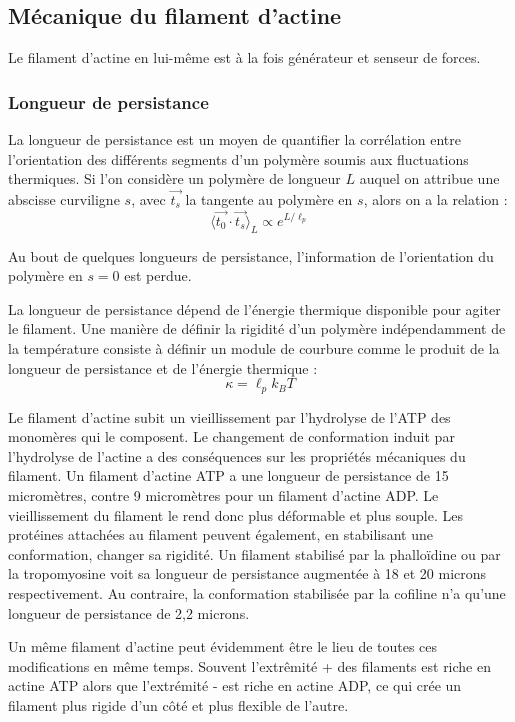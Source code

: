 \subsection{Mécanique du filament d'actine}

Le filament d'actine en lui-même est à la fois générateur et senseur de forces. 

 \subsubsection{Longueur de persistance}
La longueur de persistance est un moyen de quantifier la corrélation entre l'orientation des différents segments d'un polymère soumis aux fluctuations thermiques. Si l'on considère un polymère de longueur $L$ auquel on attribue une abscisse curviligne $s$, avec $\vec{t_s}$ la tangente au polymère en $s$, alors on a la relation : 
$$ \langle \vec{t_0}\cdot \vec{t_s} \rangle_L \propto e^{L/\ell_p}$$

Au bout de quelques longueurs de persistance, l'information de l'orientation du polymère en $s=0$ est perdue. 

La longueur de persistance dépend de l'énergie thermique disponible pour agiter le filament. Une manière de définir la rigidité d'un polymère indépendamment de la température consiste à définir un module de courbure comme le produit de la longueur de persistance et de l'énergie thermique : $$\kappa = \ell_p k_B T$$


Le filament d'actine subit un vieillissement par l'hydrolyse de l'ATP des monomères qui le composent. Le changement de conformation induit par l'hydrolyse de l'actine a des conséquences sur les propriétés mécaniques du filament. 
Un filament d'actine ATP a une longueur de persistance de 15 micromètres, contre 9 micromètres pour un filament d'actine ADP. Le vieillissement du filament le rend donc plus déformable et plus souple. 
Les protéines attachées au filament peuvent également, en stabilisant une conformation, changer sa rigidité. Un filament stabilisé par la phalloïdine ou par la tropomyosine voit sa longueur de persistance augmentée à 18 et 20 microns respectivement. Au contraire, la conformation stabilisée par la cofiline n'a qu'une longueur de persistance de 2,2 microns. 

Un même filament d'actine peut évidemment être le lieu de toutes ces modifications en même temps. Souvent l'extrêmité + des filaments est riche en actine ATP alors que l'extrémité - est riche en actine ADP, ce qui crée un filament plus rigide d'un côté et plus flexible de l'autre. 

